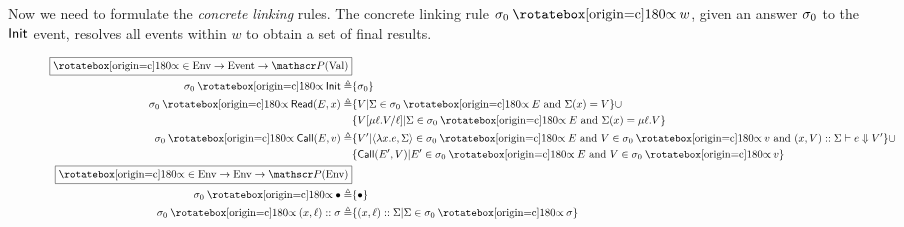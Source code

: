 Now we need to formulate the \emph{concrete linking} rules.
The concrete linking rule $\ctx_0\semlink w$, given an answer $\sigma_0$ to the $\textsf{Init}$ event, resolves all events within $w$ to obtain a set of final results.

\begin{figure}
  \begin{align*}
    \fbox{$\semlink\in\Ctx\rightarrow\Event\rightarrow\pset(\Value)$}                                                                                                                                        \\
    \ctx_0\semlink\InitE\triangleq                         & \{\ctx_0\}                                                                                                                                      \\
    \ctx_0\semlink\ReadE(\event,x)\triangleq               & \{V|\Sigma\in\ctx_0\semlink\event\text{ and }\Sigma(x)=V\}\cup                                                                                  \\
                                                           & \{V[\mu\ell.V/\ell]|\Sigma\in\ctx_0\semlink E\text{ and }\Sigma(x)=\mu\ell.V\}                                                                  \\
    \ctx_0\semlink\CallE(\event,v)\triangleq               & \{V'|\langle\lambda x.e,\Sigma\rangle\in\ctx_0\semlink E\text{ and }V\in\ctx_0\semlink v\text{ and }(x,V)\cons\Sigma\vdash e\Downarrow V'\}\cup \\
                                                           & \{\CallE(\event',V)|\event'\in\ctx_0\semlink\event\text{ and }V\in\ctx_0\semlink v\}                                                            \\
    \fbox{$\semlink\in\Ctx\rightarrow\Ctx\rightarrow\pset(\Ctx)$}                                                                                                                                            \\
    \ctx_0\semlink\bullet\triangleq                        & \{\bullet\}                                                                                                                                     \\
    \ctx_0\semlink(x,\ell)\cons\ctx\triangleq              & \{(x,\ell)\cons\Sigma|\Sigma\in\ctx_0\semlink\ctx\}                                                                                             \\

\end{align*}
\end{figure}
